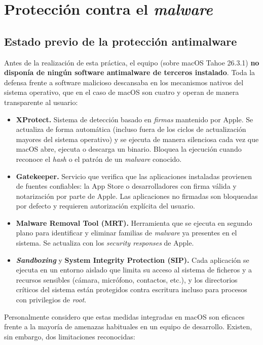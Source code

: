 \chapter{Protección contra el \textit{malware}}

\section{Estado previo de la protección antimalware}

Antes de la realización de esta práctica, el equipo (sobre macOS Tahoe 26.3.1) \textbf{no disponía de ningún software antimalware de terceros instalado}. Toda la defensa frente a software malicioso descansaba en los mecanismos nativos del sistema operativo, que en el caso de macOS son cuatro y operan de manera transparente al usuario:

\begin{itemize}[leftmargin=*]
    \item \textbf{XProtect.} Sistema de detección basado en \textit{firmas} mantenido por Apple. Se actualiza de forma automática (incluso fuera de los ciclos de actualización mayores del sistema operativo) y se ejecuta de manera silenciosa cada vez que macOS abre, ejecuta o descarga un binario. Bloquea la ejecución cuando reconoce el \textit{hash} o el patrón de un \textit{malware} conocido.
    \item \textbf{Gatekeeper.} Servicio que verifica que las aplicaciones instaladas provienen de fuentes confiables: la App Store o desarrolladores con firma válida y notarización por parte de Apple. Las aplicaciones no firmadas son bloqueadas por defecto y requieren autorización explícita del usuario.
    \item \textbf{Malware Removal Tool (MRT).} Herramienta que se ejecuta en segundo plano para identificar y eliminar familias de \textit{malware} ya presentes en el sistema. Se actualiza con los \textit{security responses} de Apple.
    \item \textbf{\textit{Sandboxing}} y \textbf{System Integrity Protection (SIP).} Cada aplicación se ejecuta en un entorno aislado que limita su acceso al sistema de ficheros y a recursos sensibles (cámara, micrófono, contactos, etc.), y los directorios críticos del sistema están protegidos contra escritura incluso para procesos con privilegios de \textit{root}.
\end{itemize}

Personalmente considero que estas medidas integradas en macOS son eficaces frente a la mayoría de amenazas habituales en un equipo de desarrollo. Existen, sin embargo, dos limitaciones reconocidas:

